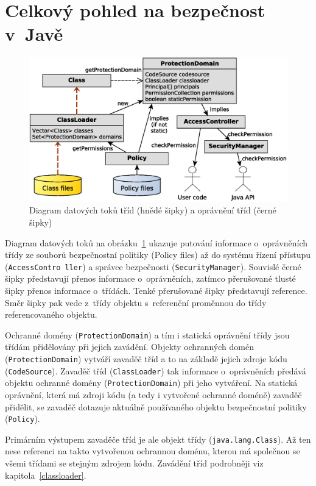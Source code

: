 \section{Celkový pohled na bezpečnost v~Javě} \label{celkovyPohled}

\begin{figure}[ht]
  \centering
  \includegraphics[width=14cm]{fig/domain-schema}
  \caption{Diagram datových toků tříd (hnědé šipky) a oprávnění tříd (černé šipky)}
  \label{diagramDatovychToku}
\end{figure}

Diagram datových toků na obrázku~\ref{diagramDatovychToku} ukazuje putování informace o~oprávněních třídy ze souborů bezpečnostní politiky (Policy files) až do systému řízení přístupu ({\tt AccessContro ller}) a správce bezpečnosti ({\tt SecurityManager}). Souvislé černé šipky představují přenos informace o~oprávněních, zatímco přerušované tlusté šipky přenos informace o~třídách. Tenké přerušované šipky představují reference. Směr šipky pak vede z~třídy objektu s~referenční proměnnou do třídy referencovaného objektu.

Ochranné domény ({\tt ProtectionDomain}) a tím i statická oprávnění třídy jsou třídám přidělovány při jejich zavádění.
Objekty ochranných domén ({\tt ProtectionDomain}) vytváří zavaděč tříd a to na základě jejich zdroje kódu ({\tt CodeSource}).
Zavaděč tříd ({\tt ClassLoader}) tak informace o~oprávněních předává objektu ochranné domény ({\tt ProtectionDomain}) při jeho vytváření.
Na statická oprávnění, která má zdroji kódu (a tedy i vytvořené ochranné doméně) zavaděč přidělit, se zavaděč dotazuje aktuálně používaného objektu bezpečnostní politiky ({\tt Policy}).

Primárním výstupem zavaděče tříd je ale objekt třídy ({\tt java.lang.Class}).
Až ten nese referenci na takto vytvořenou ochrannou doménu, kterou má společnou se všemi třídami se stejným zdrojem kódu.
Zavádění tříd podrobněji viz kapitola~\ref{classloader}.

